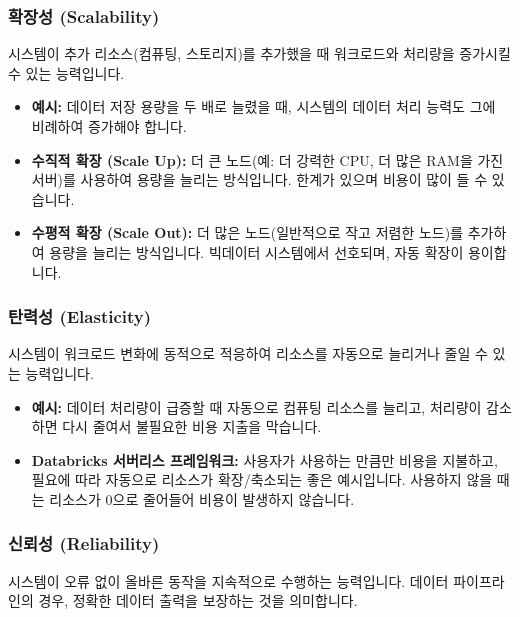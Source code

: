 \documentclass[11pt,a4paper]{article}
\begin{document}
\begin{enumerate}
\subsubsection{확장성 (Scalability)}
\begin{conceptbox}
시스템이 추가 리소스(컴퓨팅, 스토리지)를 추가했을 때 워크로드와 처리량을 증가시킬 수 있는 능력입니다.
\end{conceptbox}
\begin{itemize}
    \item \textbf{예시:} 데이터 저장 용량을 두 배로 늘렸을 때, 시스템의 데이터 처리 능력도 그에 비례하여 증가해야 합니다.
    \item \textbf{수직적 확장 (Scale Up):} 더 큰 노드(예: 더 강력한 CPU, 더 많은 RAM을 가진 서버)를 사용하여 용량을 늘리는 방식입니다. 한계가 있으며 비용이 많이 들 수 있습니다.
    \item \textbf{수평적 확장 (Scale Out):} 더 많은 노드(일반적으로 작고 저렴한 노드)를 추가하여 용량을 늘리는 방식입니다. 빅데이터 시스템에서 선호되며, 자동 확장이 용이합니다.
\end{itemize}

\subsubsection{탄력성 (Elasticity)}
\begin{conceptbox}
시스템이 워크로드 변화에 동적으로 적응하여 리소스를 자동으로 늘리거나 줄일 수 있는 능력입니다.
\end{conceptbox}
\begin{itemize}
    \item \textbf{예시:} 데이터 처리량이 급증할 때 자동으로 컴퓨팅 리소스를 늘리고, 처리량이 감소하면 다시 줄여서 불필요한 비용 지출을 막습니다.
    \item \textbf{Databricks 서버리스 프레임워크:} 사용자가 사용하는 만큼만 비용을 지불하고, 필요에 따라 자동으로 리소스가 확장/축소되는 좋은 예시입니다. 사용하지 않을 때는 리소스가 0으로 줄어들어 비용이 발생하지 않습니다.
\end{itemize}

\subsubsection{신뢰성 (Reliability)}
\begin{conceptbox}
시스템이 오류 없이 올바른 동작을 지속적으로 수행하는 능력입니다. 데이터 파이프라인의 경우, 정확한 데이터 출력을 보장하는 것을 의미합니다.
\end{conceptbox}


\end{enumerate}
\end{document}
